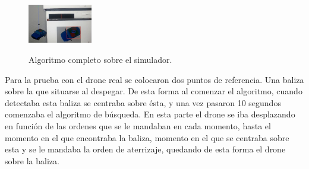 \begin{figure}[H]
{   \label{f:Busqueda}
    \includegraphics[width=0.25\textwidth]{imgs/busqueda6.jpg}} \\
 \caption{Algoritmo completo sobre el simulador. }
 \label{f:Algoritmo completo sobre el simulador. }
\end{figure}


\hspace{1cm} Para la prueba con el drone real se colocaron dos puntos de referencia. Una baliza sobre la que situarse al despegar. De esta forma al comenzar el algoritmo, cuando detectaba esta baliza se centraba sobre \'esta, y una vez pasaron 10 segundos comenzaba el algoritmo de b\'usqueda. En esta parte el drone se iba desplazando en funci\'on de las ordenes que se le mandaban en cada momento, hasta el momento en el que encontraba la baliza, momento en el que se centraba sobre esta y se le mandaba la orden de aterrizaje, quedando de esta forma el drone sobre la baliza. 
